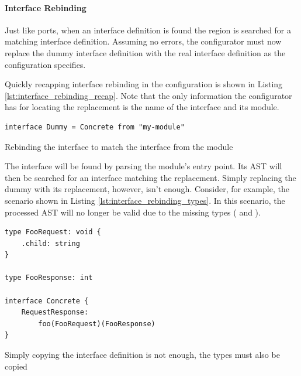 \paragraph{Interface Rebinding}

Just like ports, when an interface definition is found the  region
is searched for a matching interface definition. Assuming no errors, the
configurator must now replace the dummy interface definition with the real
interface definition as the configuration specifies.

Quickly recapping interface rebinding in the configuration is shown in Listing
\ref{lst:interface_rebinding_recap}. Note that the only information the
configurator has for locating the replacement is the name of the interface and
its module.

\begin{listing}[H]
\begin{verbatim}
interface Dummy = Concrete from "my-module"
\end{verbatim}

\caption{Rebinding the interface  to match the interface
     from the module }

\label{lst:interface_rebinding_recap}

\end{listing}

The interface will be found by parsing the module's entry point. Its AST will
then be searched for an interface matching the replacement. Simply replacing
the dummy with its replacement, however, isn't enough. Consider, for example,
the scenario shown in Listing \ref{lst:interface_rebinding_types}. In this
scenario, the processed AST will no longer be valid due to the missing types
( and ).

\begin{listing}[H]
\begin{verbatim}
type FooRequest: void {
    .child: string
}

type FooResponse: int

interface Concrete {
    RequestResponse:
        foo(FooRequest)(FooResponse)
}
\end{verbatim}

\caption{Simply copying the interface definition is not enough, the types must
    also be copied}

\label{lst:interface_rebinding_types}
\end{listing}

